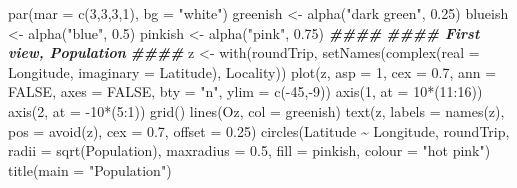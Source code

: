 \documentclass[
]{article}
\newenvironment{Shaded}{\begin{snugshade}}{\end{snugshade}}
\newcommand{\AttributeTok}[1]{\textcolor[rgb]{0.77,0.63,0.00}{#1}}
\newcommand{\ConstantTok}[1]{\textcolor[rgb]{0.00,0.00,0.00}{#1}}
\newcommand{\DecValTok}[1]{\textcolor[rgb]{0.00,0.00,0.81}{#1}}
\newcommand{\DocumentationTok}[1]{\textcolor[rgb]{0.56,0.35,0.01}{\textbf{\textit{#1}}}}
\newcommand{\FloatTok}[1]{\textcolor[rgb]{0.00,0.00,0.81}{#1}}
\newcommand{\FunctionTok}[1]{\textcolor[rgb]{0.00,0.00,0.00}{#1}}
\newcommand{\NormalTok}[1]{#1}
\newcommand{\OtherTok}[1]{\textcolor[rgb]{0.56,0.35,0.01}{#1}}
\newcommand{\SpecialCharTok}[1]{\textcolor[rgb]{0.00,0.00,0.00}{#1}}
\newcommand{\StringTok}[1]{\textcolor[rgb]{0.31,0.60,0.02}{#1}}
\begin{document}
\begin{Shaded}
\begin{Highlighting}[]
\FunctionTok{par}\NormalTok{(}\AttributeTok{mar =} \FunctionTok{c}\NormalTok{(}\DecValTok{3}\NormalTok{,}\DecValTok{3}\NormalTok{,}\DecValTok{3}\NormalTok{,}\DecValTok{1}\NormalTok{), }\AttributeTok{bg =} \StringTok{"white"}\NormalTok{)}
\NormalTok{greenish }\OtherTok{\textless{}{-}} \FunctionTok{alpha}\NormalTok{(}\StringTok{"dark green"}\NormalTok{, }\FloatTok{0.25}\NormalTok{)}
\NormalTok{blueish }\OtherTok{\textless{}{-}} \FunctionTok{alpha}\NormalTok{(}\StringTok{"blue"}\NormalTok{, }\FloatTok{0.5}\NormalTok{)}
\NormalTok{pinkish }\OtherTok{\textless{}{-}} \FunctionTok{alpha}\NormalTok{(}\StringTok{"pink"}\NormalTok{, }\FloatTok{0.75}\NormalTok{)}
\DocumentationTok{\#\#\#\# }
\DocumentationTok{\#\#\#\# First view, Population}
\DocumentationTok{\#\#\#\# }
\NormalTok{z }\OtherTok{\textless{}{-}} \FunctionTok{with}\NormalTok{(roundTrip, }\FunctionTok{setNames}\NormalTok{(}\FunctionTok{complex}\NormalTok{(}\AttributeTok{real =}\NormalTok{ Longitude, }
                                      \AttributeTok{imaginary =}\NormalTok{ Latitude), }
\NormalTok{                              Locality))}
\FunctionTok{plot}\NormalTok{(z, }\AttributeTok{asp =} \DecValTok{1}\NormalTok{, }\AttributeTok{cex =} \FloatTok{0.7}\NormalTok{, }\AttributeTok{ann =} \ConstantTok{FALSE}\NormalTok{, }\AttributeTok{axes =} \ConstantTok{FALSE}\NormalTok{, }\AttributeTok{bty =} \StringTok{"n"}\NormalTok{, }
     \AttributeTok{ylim =} \FunctionTok{c}\NormalTok{(}\SpecialCharTok{{-}}\DecValTok{45}\NormalTok{,}\SpecialCharTok{{-}}\DecValTok{9}\NormalTok{))}
\FunctionTok{axis}\NormalTok{(}\DecValTok{1}\NormalTok{, }\AttributeTok{at =} \DecValTok{10}\SpecialCharTok{*}\NormalTok{(}\DecValTok{11}\SpecialCharTok{:}\DecValTok{16}\NormalTok{))}
\FunctionTok{axis}\NormalTok{(}\DecValTok{2}\NormalTok{, }\AttributeTok{at =} \SpecialCharTok{{-}}\DecValTok{10}\SpecialCharTok{*}\NormalTok{(}\DecValTok{5}\SpecialCharTok{:}\DecValTok{1}\NormalTok{))}
\FunctionTok{grid}\NormalTok{()}
\FunctionTok{lines}\NormalTok{(Oz, }\AttributeTok{col =}\NormalTok{ greenish)}
\FunctionTok{text}\NormalTok{(z, }\AttributeTok{labels =} \FunctionTok{names}\NormalTok{(z), }\AttributeTok{pos =} \FunctionTok{avoid}\NormalTok{(z), }\AttributeTok{cex =} \FloatTok{0.7}\NormalTok{, }\AttributeTok{offset =} \FloatTok{0.25}\NormalTok{)}
\FunctionTok{circles}\NormalTok{(Latitude }\SpecialCharTok{\textasciitilde{}}\NormalTok{ Longitude, roundTrip, }\AttributeTok{radii =} \FunctionTok{sqrt}\NormalTok{(Population), }
        \AttributeTok{maxradius =} \FloatTok{0.5}\NormalTok{, }\AttributeTok{fill =}\NormalTok{ pinkish, }\AttributeTok{colour =} \StringTok{"hot pink"}\NormalTok{)}
\FunctionTok{title}\NormalTok{(}\AttributeTok{main =} \StringTok{"Population"}\NormalTok{)}
\end{Highlighting}
\end{Shaded}
\end{document}
